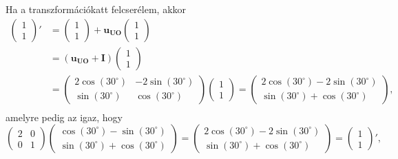 \documentclass[12pt,a4paper]{scrartcl}
\let\mathbf\bm
\begin{document}
Ha a transzformációkatt felcserélem, akkor
\[\begin{aligned}
  \left( {\begin{array}{*{20}{c}}
  1 \\ 
  1 
\end{array}} \right)' &  = \left( {\begin{array}{*{20}{c}}
  1 \\ 
  1 
\end{array}} \right) + {{\mathbf{u}}_{{\mathbf{UO}}}}\left( {\begin{array}{*{20}{c}}
  1 \\ 
  1 
\end{array}} \right) \\ 
   &  = \left( {{{\mathbf{u}}_{{\mathbf{UO}}}} + {\mathbf{I}}} \right)\left( {\begin{array}{*{20}{c}}
  1 \\ 
  1 
\end{array}} \right) \\ 
   &  = \left( {\begin{array}{*{20}{c}}
  {2\cos \left( {30^\circ } \right)}&{ - 2\sin \left( {30^\circ } \right)} \\ 
  {\sin \left( {30^\circ } \right)}&{\cos \left( {30^\circ } \right)} 
\end{array}} \right)\left( {\begin{array}{*{20}{c}}
  1 \\ 
  1 
\end{array}} \right) = \left( {\begin{array}{*{20}{c}}
  {2\cos \left( {30^\circ } \right) - 2\sin \left( {30^\circ } \right)} \\ 
  {\sin \left( {30^\circ } \right) + \cos \left( {30^\circ } \right)} 
\end{array}} \right), \\ 
\end{aligned} \]
amelyre pedig az igaz, hogy 
\[\left( {\begin{array}{*{20}{c}}
  2&0 \\ 
  0&1 
\end{array}} \right)\left( {\begin{array}{*{20}{c}}
  {\cos \left( {30^\circ } \right) - \sin \left( {30^\circ } \right)} \\ 
  {\sin \left( {30^\circ } \right) + \cos \left( {30^\circ } \right)} 
\end{array}} \right) = \left( {\begin{array}{*{20}{c}}
  {2\cos \left( {30^\circ } \right) - 2\sin \left( {30^\circ } \right)} \\ 
  {\sin \left( {30^\circ } \right) + \cos \left( {30^\circ } \right)} 
\end{array}} \right) = \left( {\begin{array}{*{20}{c}}
  1 \\ 
  1 
\end{array}} \right)',\]
\end{document}
